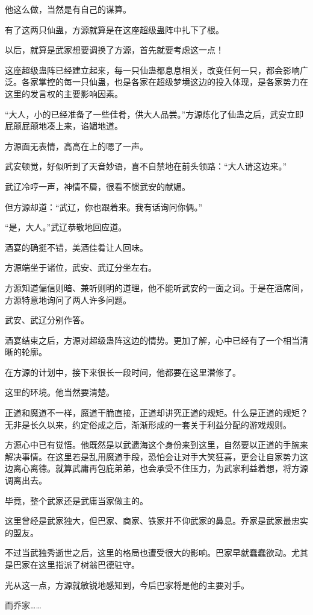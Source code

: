 \begin{this_body}
他这么做，当然是有自己的谋算。

有了这两只仙蛊，方源就算是在这座超级蛊阵中扎下了根。

以后，就算是武家想要调换了方源，首先就要考虑这一点！

这座超级蛊阵已经建立起来，每一只仙蛊都息息相关，改变任何一只，都会影响广泛。各家掌控的每一只仙蛊，也是各家在超级梦境这边的投入体现，是各家势力在这里的发言权的主要影响因素。

“大人，小的已经准备了一些佳肴，供大人品尝。”方源炼化了仙蛊之后，武安立即屁颠屁颠地凑上来，谄媚地道。

方源面无表情，高高在上的嗯了一声。

武安顿觉，好似听到了天音妙语，喜不自禁地在前头领路：“大人请这边来。”

武辽冷哼一声，神情不屑，很看不惯武安的献媚。

但方源却道：“武辽，你也跟着来。我有话询问你俩。”

“是，大人。”武辽恭敬地回应道。

酒宴的确挺不错，美酒佳肴让人回味。

方源端坐于诸位，武安、武辽分坐左右。

方源知道偏信则暗、兼听则明的道理，他不能听武安的一面之词。于是在酒席间，方源特意地询问了两人许多问题。

武安、武辽分别作答。

酒宴结束之后，方源对超级蛊阵这边的情势。更加了解，心中已经有了一个相当清晰的轮廓。

在方源的计划中，接下来很长一段时间，他都要在这里潜修了。

这里的环境。他当然要清楚。

正道和魔道不一样，魔道干脆直接，正道却讲究正道的规矩。什么是正道的规矩？无非是长久以来，约定俗成之后，渐渐形成的一套关于利益分配的游戏规则。

方源心中已有觉悟。他既然是以武遗海这个身份来到这里，自然要以正道的手腕来解决事情。在这里若是乱用魔道手段，恐怕会让对手大笑狂喜，更会让自家势力这边离心离德。就算武庸再包庇弟弟，也会承受不住压力，为武家利益着想，将方源调离出去。

毕竟，整个武家还是武庸当家做主的。

这里曾经是武家独大，但巴家、商家、铁家并不仰武家的鼻息。乔家是武家最忠实的盟友。

不过当武独秀逝世之后，这里的格局也遭受很大的影响。巴家早就蠢蠢欲动。尤其是巴家在这里指派了树翁巴德驻守。

光从这一点，方源就敏锐地感知到，今后巴家将是他的主要对手。

而乔家……


\end{this_body}
